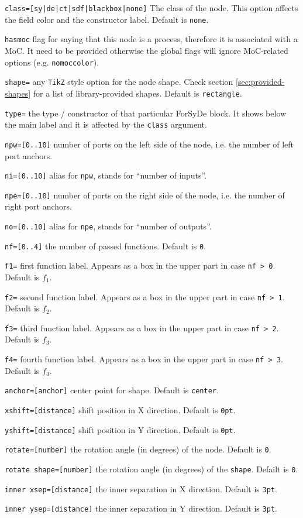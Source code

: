 \begin{optionslist}
\item \texttt{class=[sy|de|ct|sdf|blackbox|none]} The class of the node. This option affects the field color and the constructor label. Default is \texttt{none}.
\item \texttt{hasmoc} flag for saying that this node is a process, therefore it is associated with a MoC. It need to be provided otherwise the global flags will ignore MoC-related options (e.g. \texttt{nomoccolor}).
\item \texttt{shape=} any \texttt{TikZ} style option for the node shape. Check section \ref{sec:provided-shapes} for a list of library-provided shapes. Default is \texttt{rectangle}.
\item \texttt{type=} the type / constructor of that particular ForSyDe block. It shows below the main label and it is affected by the \texttt{class} argument.
\item \texttt{npw=[0..10]} number of ports on the left side of the node, i.e. the number of left port anchors.
\item \texttt{ni=[0..10]} alias for \texttt{npw}, stands for ``number of inputs''.
\item \texttt{npe=[0..10]} number of ports on the right side of the node, i.e. the number of right port anchors.
\item \texttt{no=[0..10]} alias for \texttt{npe}, stands for ``number of outputs''.
\item \texttt{nf=[0..4]} the number of passed functions. Default is \texttt{0}.
\item \texttt{f1=} first function label. Appears as a box in the upper part in case \texttt{nf > 0}. Default is $f_1$.
\item \texttt{f2=} second function label. Appears as a box in the upper part in case \texttt{nf > 1}. Default is $f_2$.
\item \texttt{f3=} third function label. Appears as a box in the upper part in case \texttt{nf > 2}. Default is $f_3$.
\item \texttt{f4=} fourth function label. Appears as a box in the upper part in case \texttt{nf > 3}. Default is $f_4$.
\item \texttt{anchor=[anchor]} center point for shape. Default is \texttt{center}.
\item \texttt{xshift=[distance]} shift position in X direction. Default is \texttt{0pt}.
\item \texttt{yshift=[distance]} shift position in Y direction. Default is \texttt{0pt}.
\item \texttt{rotate=[number]} the rotation angle (in degrees) of the node. Default is \texttt{0}.
\item \texttt{rotate shape=[number]} the rotation angle (in degrees) of the \texttt{shape}. Defailt is \texttt{0}.
\item \texttt{inner xsep=[distance]} the inner separation in X direction. Default is \texttt{3pt}.
\item \texttt{inner ysep=[distance]} the inner separation in Y direction. Default is \texttt{3pt}.
\end{optionslist}



